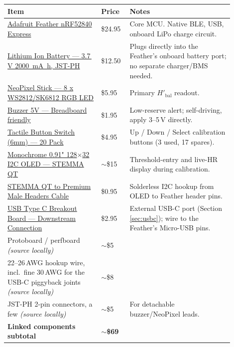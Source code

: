 \documentclass[11pt, letterpaper]{article}
\begin{document}
\begin{center}
\small
\begin{longtable}{p{0.38\linewidth}p{0.10\linewidth}p{0.42\linewidth}}
\toprule
\textbf{Item} & \textbf{Price} & \textbf{Notes} \\
\midrule
\endhead
\href{https://www.adafruit.com/product/4062}{Adafruit Feather nRF52840 Express} &
  \$24.95 & Core MCU. Native BLE, USB, onboard LiPo charge circuit. \\
\href{https://www.adafruit.com/product/2011}{Lithium Ion Battery --- 3.7\,V \SI{2000}{\milli\ampere\hour}, JST-PH} &
  \$12.50 & Plugs directly into the Feather's onboard battery port; no separate charger/BMS needed. \\
\href{https://www.adafruit.com/product/1426}{NeoPixel Stick --- 8 x WS2812/SK6812 RGB LED} &
  \$5.95 & Primary $H'_{\mathrm{bal}}$ readout. \\
\href{https://www.adafruit.com/product/1536}{Buzzer 5V --- Breadboard friendly} &
  \$1.95 & Low-reserve alert; self-driving, apply 3--5\,V directly. \\
\href{https://www.adafruit.com/product/367}{Tactile Button Switch (6mm) --- 20 Pack} &
  \$4.95 & Up / Down / Select calibration buttons (3 used, 17 spares). \\
\href{https://www.adafruit.com/product/4440}{Monochrome 0.91" 128$\times$32 I2C OLED --- STEMMA QT} &
  $\sim$\$15 & Threshold-entry and live-HR display during calibration. \\
\href{https://www.adafruit.com/product/4209}{STEMMA QT to Premium Male Headers Cable} &
  \$0.95 & Solderless I2C hookup from OLED to Feather header pins. \\
\href{https://www.adafruit.com/product/4090}{USB Type C Breakout Board --- Downstream Connection} &
  \$2.95 & External USB-C port (Section \ref{sec:usbc}); wire to the Feather's Micro-USB pins. \\
\midrule
Protoboard / perfboard \textit{(source locally)} & $\sim$\$5 & \\
22--26\,AWG hookup wire, incl.\ fine 30\,AWG for the USB-C piggyback joints \textit{(source locally)} &
  $\sim$\$8 & \\
JST-PH 2-pin connectors, a few \textit{(source locally)} & $\sim$\$5 & For detachable buzzer/NeoPixel leads. \\
\midrule
\textbf{Linked components subtotal} & \textbf{$\sim$\$69} & \\
\bottomrule
\end{longtable}
\end{center}
\end{document}
